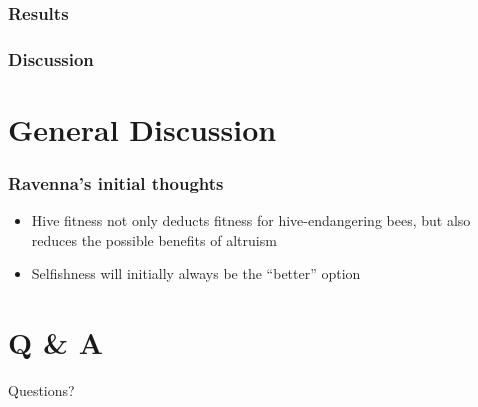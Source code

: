 \documentclass{beamer}
\begin{document}
      \subsubsection{Results} %
      \label{ssub:results}

      \subsubsection{Discussion} %
      \label{ssub:discussion}



  \section{General Discussion} %
  \label{sec:general_discussion}
  
  \begin{frame}[t]\frametitle{Ravenna's initial thoughts}
    \begin{itemize}
      \item Hive fitness not only deducts fitness for hive-endangering bees,
            but also reduces the possible benefits of altruism
      \item Selfishness will initially always be the ``better'' option
    \end{itemize}
  \end{frame}


  \section{Q \& A} %
  \label{sec:q_and_a}
    \begin{frame}{Questions?}
      \titlepage
    \end{frame}
\end{document}
